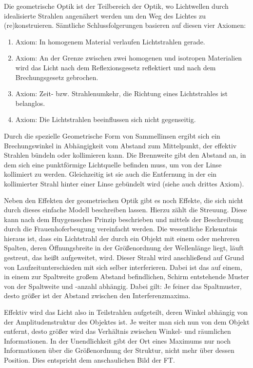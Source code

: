 
Die geometrische Optik ist der Teilbereich der Optik, wo Lichtwellen durch idealisierte Strahlen angenähert werden um den Weg des Lichtes zu (re)konstruieren. Sämtliche Schlussfolgerungen basieren auf diesen vier Axiomen:

\begin{enumerate}
	\item{Axiom:} In homogenem Material verlaufen Lichtstrahlen gerade.
	\item{Axiom:} An der Grenze zwischen zwei homogenen und isotropen Materialien wird das Licht nach dem Reflexionsgesetz reflektiert und nach dem Brechungsgesetz gebrochen.
	\item{Axiom:} Zeit- bzw. Strahlenumkehr, die Richtung eines Lichtstrahles ist belanglos.
	\item{Axiom:} Die Lichtstrahlen beeinflussen sich nicht gegenseitig.
\end{enumerate}

Durch die spezielle Geometrische Form von Sammellinsen ergibt sich ein Brechungswinkel in Abhängigkeit vom Abstand zum Mittelpunkt, der effektiv Strahlen bündeln oder kollimieren kann. Die Brennweite gibt den Abstand an, in dem sich eine punktförmige Lichtquelle befinden muss, um von der Linse kollimiert zu werden. Gleichzeitig ist sie auch die Entfernung in der ein kollimierter Strahl hinter einer Linse gebündelt wird (siehe auch drittes Axiom).

Neben den Effekten der geometrischen Optik gibt es noch Effekte, die sich nicht durch dieses einfache Modell beschreiben lassen. Hierzu zählt die Streuung. Diese kann nach dem Huygenssches Prinzip\cite{_huygenssches_????} beschrieben und mittels der Beschreibung durch die Frauenhoferbeugung\cite{_beugungsintegral_2015} vereinfacht werden. Die wesentliche Erkenntnis hieraus ist, dass ein Lichtstrahl der durch ein Objekt mit einem oder mehreren Spalten, deren Öffnungsbreite in der Größenordnung der Wellenlänge liegt, läuft gestreut, das heißt aufgeweitet, wird. Dieser Strahl wird anschließend auf Grund von Laufzeitunterschieden mit sich selber interferieren. Dabei ist das auf einem, in einem zur Spaltweite großem Abstand befindlichen, Schirm entstehende Muster von der Spaltweite und -anzahl abhängig. Dabei gilt: Je feiner das Spaltmuster, desto größer ist der Abstand zwischen den Interferenzmaxima.

Effektiv wird das Licht also in Teilstrahlen aufgeteilt, deren Winkel abhängig von der Amplitudenstruktur des Objektes ist. Je weiter man sich nun von dem Objekt entfernt, desto größer wird das Verhältnis zwischen Winkel- und räumlichen Informationen. In der Unendlichkeit gibt der Ort eines Maximums nur noch Informationen über die Größenordnung der Struktur, nicht mehr über dessen Position. Dies entspricht dem anschaulichen Bild der FT.

